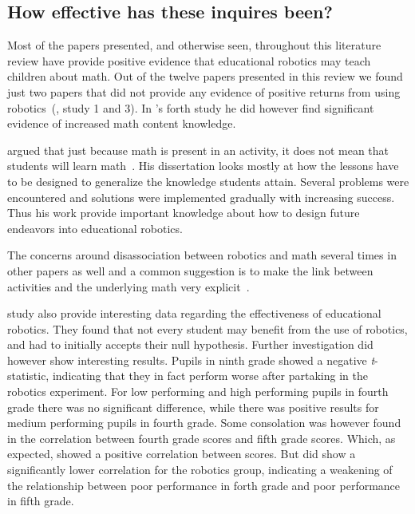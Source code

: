 \subsection{How effective has these inquires been?}
Most of the papers presented, and otherwise seen, throughout this literature review have provide positive evidence that educational robotics
may teach children about math. 
Out of the twelve papers presented in this review we found just two papers that did not provide any evidence of positive returns from using robotics~(, study 1 and 3). 
In \citeauthor{silk2011resources}'s forth study he did however find significant evidence of increased math content knowledge. 

\bigskip\noindent
\citeauthor{silk2011resources} argued that just because math is present in an activity, it does not mean that students will learn math~\cite{silk2011resources}.
His dissertation looks mostly at how the lessons have to be designed to generalize the knowledge students attain. Several problems were encountered and solutions were implemented gradually with increasing success. 
Thus his work provide important knowledge about how to design future endeavors into educational robotics. 

\bigskip\noindent
The concerns around disassociation between robotics and math several times in other papers as well and a common suggestion is to make the link between activities and the underlying math very explicit~\cite{nugent2008effect}. 

\bigskip\noindent
\citeauthor*{lindh2007does} study also provide interesting data regarding the effectiveness of educational robotics. 
They found that not every student may benefit from the use of robotics, and had to initially accepts their null hypothesis. 
Further investigation did however show interesting results. 
Pupils in ninth grade showed a negative \textit{t}-statistic, indicating that they in fact perform worse after partaking in the robotics experiment. 
For low performing and high performing pupils in fourth grade there was no significant difference, while there was positive results for medium performing pupils in fourth grade. 
Some consolation was however found in the correlation between fourth grade scores and fifth grade scores. 
Which, as expected, showed a positive correlation between scores. 
But did show a significantly lower correlation for the robotics group, indicating a weakening of the relationship between poor performance in forth grade and poor performance in fifth grade. 


